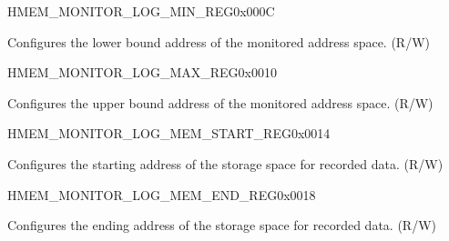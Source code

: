 \begin{register}{H}{MEM\_MONITOR\_LOG\_MIN\_REG}{0x000C}\label{regdesc:MEMMONITORLOGMINREG}
%
\regnewline%
\begin{regdesc}\begin{reglist}
\label{fielddesc:MEMMONITORLOGMIN}\item [MEM\_MONITOR\_LOG\_MIN] Configures the lower bound address of the monitored address space. (R/W)
\end{reglist}\end{regdesc}
\end{register}


\begin{register}{H}{MEM\_MONITOR\_LOG\_MAX\_REG}{0x0010}\label{regdesc:MEMMONITORLOGMAXREG}
%
\regnewline%
\begin{regdesc}\begin{reglist}
\label{fielddesc:MEMMONITORLOGMAX}\item [MEM\_MONITOR\_LOG\_MAX] Configures the upper bound address of the monitored address space. (R/W)
\end{reglist}\end{regdesc}
\end{register}


\begin{register}{H}{MEM\_MONITOR\_LOG\_MEM\_START\_REG}{0x0014}\label{regdesc:MEMMONITORLOGMEMSTARTREG}
%
\regnewline%
\begin{regdesc}\begin{reglist}
\label{fielddesc:MEMMONITORLOGMEMSTART}\item [MEM\_MONITOR\_LOG\_MEM\_START] Configures the starting address of the storage space for recorded data. (R/W)
\end{reglist}\end{regdesc}
\end{register}


\begin{register}{H}{MEM\_MONITOR\_LOG\_MEM\_END\_REG}{0x0018}\label{regdesc:MEMMONITORLOGMEMENDREG}
%
\regnewline%
\begin{regdesc}\begin{reglist}
\label{fielddesc:MEMMONITORLOGMEMEND}\item [MEM\_MONITOR\_LOG\_MEM\_END] Configures the ending address of the storage space for recorded data. (R/W)
\end{reglist}\end{regdesc}
\end{register}


